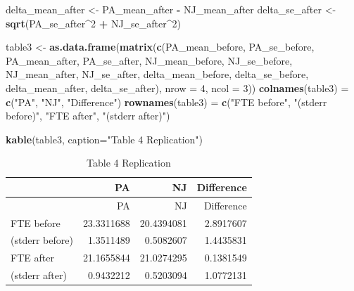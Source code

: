 \documentclass[
]{article}
\newenvironment{Shaded}{\begin{snugshade}}{\end{snugshade}}
\newcommand{\AttributeTok}[1]{\textcolor[rgb]{0.13,0.29,0.53}{#1}}
\newcommand{\DecValTok}[1]{\textcolor[rgb]{0.00,0.00,0.81}{#1}}
\newcommand{\FunctionTok}[1]{\textcolor[rgb]{0.13,0.29,0.53}{\textbf{#1}}}
\newcommand{\NormalTok}[1]{#1}
\newcommand{\OtherTok}[1]{\textcolor[rgb]{0.56,0.35,0.01}{#1}}
\newcommand{\SpecialCharTok}[1]{\textcolor[rgb]{0.81,0.36,0.00}{\textbf{#1}}}
\newcommand{\StringTok}[1]{\textcolor[rgb]{0.31,0.60,0.02}{#1}}
\begin{document}
\begin{Shaded}
\begin{Highlighting}[]
\NormalTok{delta\_mean\_after }\OtherTok{\textless{}{-}}\NormalTok{ PA\_mean\_after }\SpecialCharTok{{-}}\NormalTok{ NJ\_mean\_after}
\NormalTok{delta\_se\_after }\OtherTok{\textless{}{-}} \FunctionTok{sqrt}\NormalTok{(PA\_se\_after}\SpecialCharTok{\^{}}\DecValTok{2} \SpecialCharTok{+}\NormalTok{ NJ\_se\_after}\SpecialCharTok{\^{}}\DecValTok{2}\NormalTok{)}

\NormalTok{table3 }\OtherTok{\textless{}{-}} \FunctionTok{as.data.frame}\NormalTok{(}\FunctionTok{matrix}\NormalTok{(}\FunctionTok{c}\NormalTok{(PA\_mean\_before, PA\_se\_before,}
\NormalTok{                                 PA\_mean\_after, PA\_se\_after,}
\NormalTok{                                 NJ\_mean\_before, NJ\_se\_before,}
\NormalTok{                                 NJ\_mean\_after, NJ\_se\_after,}
\NormalTok{                                 delta\_mean\_before, delta\_se\_before,}
\NormalTok{                                 delta\_mean\_after, delta\_se\_after),}
                         \AttributeTok{nrow =} \DecValTok{4}\NormalTok{, }\AttributeTok{ncol =} \DecValTok{3}\NormalTok{))}
\FunctionTok{colnames}\NormalTok{(table3) }\OtherTok{=} \FunctionTok{c}\NormalTok{(}\StringTok{"PA"}\NormalTok{, }\StringTok{"NJ"}\NormalTok{, }\StringTok{"Difference"}\NormalTok{)}
\FunctionTok{rownames}\NormalTok{(table3) }\OtherTok{=} \FunctionTok{c}\NormalTok{(}\StringTok{"FTE before"}\NormalTok{, }\StringTok{"(stderr before)"}\NormalTok{, }\StringTok{"FTE after"}\NormalTok{, }\StringTok{"(stderr after)"}\NormalTok{)}

\FunctionTok{kable}\NormalTok{(table3, }\AttributeTok{caption=}\StringTok{"Table 4 Replication"}\NormalTok{)}
\end{Highlighting}
\end{Shaded}

\begin{longtable}[]{@{}lrrr@{}}
\caption{Table 4 Replication}\tabularnewline
\toprule\noalign{}
& PA & NJ & Difference \\
\midrule\noalign{}
\endfirsthead
\toprule\noalign{}
& PA & NJ & Difference \\
\midrule\noalign{}
\endhead
\bottomrule\noalign{}
\endlastfoot
FTE before & 23.3311688 & 20.4394081 & 2.8917607 \\
(stderr before) & 1.3511489 & 0.5082607 & 1.4435831 \\
FTE after & 21.1655844 & 21.0274295 & 0.1381549 \\
(stderr after) & 0.9432212 & 0.5203094 & 1.0772131 \\
\end{longtable}
\end{document}
